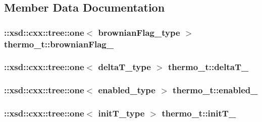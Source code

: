 \subsection{Member Data Documentation}
\hypertarget{classthermo__t_a4e7aff42cfde2e459eae29dd08cd4335}{
\subsubsection[{brownian\-Flag\-\_\-}]{\setlength{\rightskip}{0pt plus 5cm}\-::xsd\-::cxx\-::tree\-::one$<$ {\bf brownian\-Flag\-\_\-type} $>$ thermo\-\_\-t\-::brownian\-Flag\-\_\-\hspace{0.3cm}{\ttfamily [protected]}}}\label{classthermo__t_a4e7aff42cfde2e459eae29dd08cd4335}
\hypertarget{classthermo__t_a76fc3ddc3befeeab5226f255391a054c}{
\subsubsection[{delta\-T\-\_\-}]{\setlength{\rightskip}{0pt plus 5cm}\-::xsd\-::cxx\-::tree\-::one$<$ {\bf delta\-T\-\_\-type} $>$ thermo\-\_\-t\-::delta\-T\-\_\-\hspace{0.3cm}{\ttfamily [protected]}}}\label{classthermo__t_a76fc3ddc3befeeab5226f255391a054c}
\hypertarget{classthermo__t_a943300cbe544be4d59d3962eaba464d2}{
\subsubsection[{enabled\-\_\-}]{\setlength{\rightskip}{0pt plus 5cm}\-::xsd\-::cxx\-::tree\-::one$<$ {\bf enabled\-\_\-type} $>$ thermo\-\_\-t\-::enabled\-\_\-\hspace{0.3cm}{\ttfamily [protected]}}}\label{classthermo__t_a943300cbe544be4d59d3962eaba464d2}
\hypertarget{classthermo__t_a40762511b36c05a5923bad0cb1b49f39}{
\subsubsection[{init\-T\-\_\-}]{\setlength{\rightskip}{0pt plus 5cm}\-::xsd\-::cxx\-::tree\-::one$<$ {\bf init\-T\-\_\-type} $>$ thermo\-\_\-t\-::init\-T\-\_\-\hspace{0.3cm}{\ttfamily [protected]}}}\label{classthermo__t_a40762511b36c05a5923bad0cb1b49f39}
